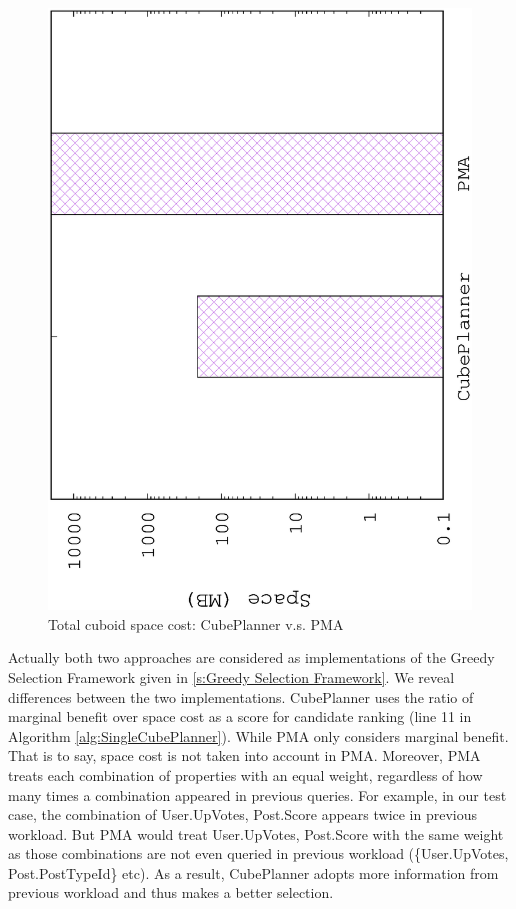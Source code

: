 \begin{figure}[H]
	\centering
	\includegraphics[scale=0.5, angle=270]{plot/jiaweispace.eps}
	\caption{Total cuboid space cost: CubePlanner v.s. PMA}
	\label{fig:jiaweispace}
\end{figure}

Actually both two approaches are considered as implementations of the Greedy Selection Framework given in \ref{s:Greedy Selection Framework}. We reveal differences between the two implementations. CubePlanner uses the ratio of marginal benefit over space cost as a score for candidate ranking (line 11 in Algorithm \ref{alg:SingleCubePlanner}). While PMA only considers marginal benefit. That is to say, space cost is not taken into account in PMA. Moreover, PMA treats each combination of properties with an equal weight, regardless of how many times a combination appeared in previous queries. For example, in our test case, the combination of {User.UpVotes, Post.Score} appears twice in previous workload. But PMA would treat {User.UpVotes, Post.Score} with the same weight as those combinations are not even queried in previous workload (\{User.UpVotes, Post.PostTypeId\} etc). As a result, CubePlanner adopts more information from previous workload and thus makes a better selection.

